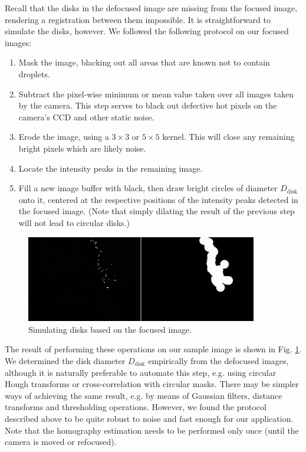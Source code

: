 \documentclass[preprint]{elsarticle}
\begin{document}
Recall that the disks in the defocused image are missing from the focused image,
rendering a registration between them impossible. It is straightforward to
simulate the disks, however. We followed the following protocol on our focused
images:
\begin{enumerate}
    \item Mask the image, blacking out all areas that are known not to contain
        droplets.
    \item Subtract the pixel-wise minimum or mean value taken over all images
        taken by the camera. This step serves to black out defective hot pixels
        on the camera's CCD and other static noise.
    \item Erode the image, using a $3\times 3$ or $5\times 5$ kernel. This will
        close any remaining bright pixels which are likely noise.
    \item Locate the intensity peaks in the remaining image.
    \item Fill a new image buffer with black, then draw bright circles of diameter
        $D_\text{disk}$ onto it, centered at the respective positions of the
        intensity peaks detected in the focused image. (Note that simply dilating
        the result of the previous step will not lead to circular disks.)
\end{enumerate}
\begin{figure}
    \centering
    \includegraphics[width=0.9\textwidth]{orb_images/dilation.jpg}
    \caption{Simulating disks based on the focused image. \label{fig:making-disks}}
\end{figure}

The result of performing these operations on our sample image is shown in Fig.
\ref{fig:making-disks}. We determined the disk diameter $D_\text{disk}$
empirically from the defocused images, although it is naturally preferable to
automate this step, e.g. using circular Hough transforms or cross-correlation
with circular masks. There may be simpler ways of achieving the same result,
e.g. by means of Gaussian filters, distance transforms and thresholding
operations. However, we found the protocol described above to be quite robust to
noise and fast enough for our application. Note that the homography estimation
needs to be performed only once (until the camera is moved or refocused).
\end{document}
